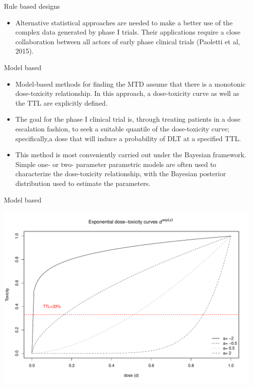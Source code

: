 \documentclass{beamer}
\begin{document}
\begin{frame}{Rule based designs}

\begin{itemize}
\itemsep1pt\parskip0pt
\item
  Alternative statistical approaches are needed to make a better use of
  the complex data generated by phase I trials. Their applications
  require a close collaboration between all actors of early phase
  clinical trials (Paoletti et al, 2015).
\end{itemize}

\end{frame}

\begin{frame}{Model based}

\begin{itemize}
\itemsep1pt\parskip0pt
\item
  Model-based methods for finding the MTD assume that there is a
  monotonic dose-toxicity relationship. In this approach, a
  dose-toxicity curve as well as the TTL are explicitly defined.
\item
  The goal for the phase I clinical trial is, through treating patients
  in a dose escalation fashion, to seek a suitable quantile of the
  dose-toxicity curve; specifically,a dose that will induce a
  probability of DLT at a specified TTL.
\item
  This method is most conveniently carried out under the Bayesian
  framework. Simple one- or two- parameter parametric models are often
  used to characterize the dose-toxicity relationship, with the Bayesian
  posterior distribution used to estimate the parameters.
\end{itemize}

\end{frame}

\begin{frame}{Model based}

\begin{center}\includegraphics[scale=0.4]{indexPdf_files/figure-beamer/unnamed-chunk-1-1} \end{center}

\end{frame}
\end{document}

